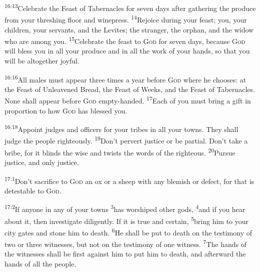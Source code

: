 \documentclass[openany,12pt,english]{book}
\newenvironment{para}{\par\pretolerance=100\tolerance=200\setlength{\emergencystretch}{0.6em}\relax}{\par}
\begin{document}
\begin{para}
    \textsuperscript{16:13}\thinspace{}Cel\-e\-brate the Feast of Tabernacles for sev\-en days af\-ter gath\-er\-ing the pro\-duce from your threshing floor and wine\-press.
    \textsuperscript{14}\thinspace{}Re\-joice dur\-ing your feast; you, your chil\-dren, your servants, and the Levites; the strang\-er, the or\-phan, and the wid\-ow who are a\-mong you.
    \textsuperscript{15}\thinspace{}Cel\-e\-brate the feast to \textsc{God} for sev\-en days, be\-cause \textsc{God} will bless you in all your pro\-duce and in all the work of your hands, so that you will be al\-to\-geth\-er joy\-ful.
\end{para}

\begin{para}
    \textsuperscript{16:16}\thinspace{}All males must ap\-pear three times a year be\-fore \textsc{God} where he chooses: at the Feast of Un\-leav\-ened Bread, the Feast of Weeks, and the Feast of Tabernacles. None shall ap\-pear be\-fore \textsc{God} empty-handed.
    \textsuperscript{17}\thinspace{}Each of you must bring a gift in pro\-por\-tion to how \textsc{God} has bless\-ed you.
\end{para}

\begin{para}
    \textsuperscript{16:18}\thinspace{}Ap\-point judges and officers for your tribes in all your towns. They shall judge the peo\-ple right\-eous\-ly.
    \textsuperscript{19}\thinspace{}Don't per\-vert jus\-tice or be par\-tial. Don't take a bribe, for it blinds the wise and twists the words of the right\-eous.
    \textsuperscript{20}\thinspace{}Pur\-sue jus\-tice, and on\-ly jus\-tice.
\end{para}

\bigskip{}

\begin{para}
    \textsuperscript{17:1}\thinspace{}Don't sac\-ri\-fice to \textsc{God} an ox or a sheep with any blem\-ish or de\-fect, for that is de\-test\-a\-ble to \textsc{God}.
\end{para}

\begin{para}
    \textsuperscript{17:2}\thinspace{}If any\-one in any of your towns
    \textsuperscript{3}\thinspace{}has wor\-shiped oth\-er gods,
    \textsuperscript{4}\thinspace{}and if you hear a\-bout it, then in\-ves\-ti\-gate dil\-i\-gent\-ly. If it is true and cer\-tain,
    \textsuperscript{5}\thinspace{}bring him to your cit\-y gates and stone him to death.
    \textsuperscript{6}\thinspace{}He shall be put to death on the tes\-ti\-mo\-ny of two or three witnesses, but not on the tes\-ti\-mo\-ny of one wit\-ness.
    \textsuperscript{7}\thinspace{}The hands of the witnesses shall be first against him to put him to death, and af\-ter\-ward the hands of all the peo\-ple.
\end{para}
\end{document}
